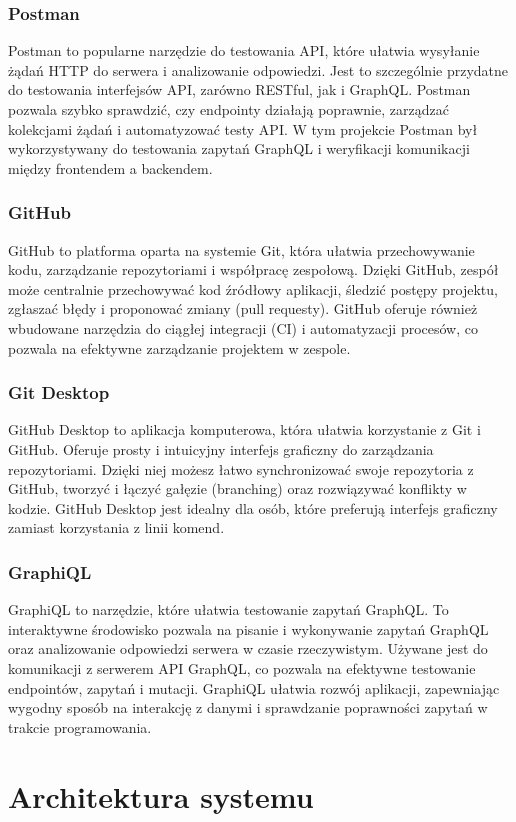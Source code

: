 \documentclass[wmii,inf,inz]{uwmthesis} %
\begin{document}
\subsection{Postman}
Postman to popularne narzędzie do testowania API, które ułatwia wysyłanie żądań HTTP do serwera i analizowanie odpowiedzi. Jest to szczególnie przydatne do testowania interfejsów API, zarówno RESTful, jak i GraphQL. Postman pozwala szybko sprawdzić, czy endpointy działają poprawnie, zarządzać kolekcjami żądań i automatyzować testy API. W tym projekcie Postman był wykorzystywany do testowania zapytań GraphQL i weryfikacji komunikacji między frontendem a backendem.
\subsection{GitHub}
GitHub to platforma oparta na systemie Git, która ułatwia przechowywanie kodu, zarządzanie repozytoriami i współpracę zespołową. Dzięki GitHub, zespół może centralnie przechowywać kod źródłowy aplikacji, śledzić postępy projektu, zgłaszać błędy i proponować zmiany (pull requesty). GitHub oferuje również wbudowane narzędzia do ciągłej integracji (CI) i automatyzacji procesów, co pozwala na efektywne zarządzanie projektem w zespole.
\subsection{Git Desktop}
GitHub Desktop to aplikacja komputerowa, która ułatwia korzystanie z Git i GitHub. Oferuje prosty i intuicyjny interfejs graficzny do zarządzania repozytoriami. Dzięki niej możesz łatwo synchronizować swoje repozytoria z GitHub, tworzyć i łączyć gałęzie (branching) oraz rozwiązywać konflikty w kodzie. GitHub Desktop jest idealny dla osób, które preferują interfejs graficzny zamiast korzystania z linii komend.
\subsection{GraphiQL}
GraphiQL to narzędzie, które ułatwia testowanie zapytań GraphQL. To interaktywne środowisko pozwala na pisanie i wykonywanie zapytań GraphQL oraz analizowanie odpowiedzi serwera w czasie rzeczywistym. Używane jest do komunikacji z serwerem API GraphQL, co pozwala na efektywne testowanie endpointów, zapytań i mutacji. GraphiQL ułatwia rozwój aplikacji, zapewniając wygodny sposób na interakcję z danymi i sprawdzanie poprawności zapytań w trakcie programowania.
\chapter{Architektura systemu}
\end{document}
